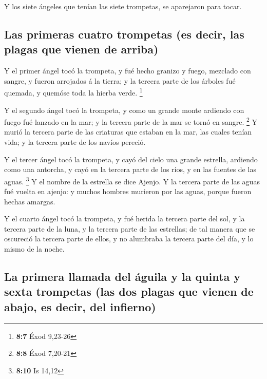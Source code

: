  Y los siete ángeles que tenían las siete trompetas, se
aparejaron para tocar.

\hypertarget{las-primeras-cuatro-trompetas-es-decir-las-plagas-que-vienen-de-arriba}{%
\subsection{Las primeras cuatro trompetas (es decir, las plagas que
vienen de
arriba)}\label{las-primeras-cuatro-trompetas-es-decir-las-plagas-que-vienen-de-arriba}}

 Y el primer ángel tocó la trompeta, y fué hecho granizo y
fuego, mezclado con sangre, y fueron arrojados á la tierra; y la tercera
parte de los árboles fué quemada, y quemóse toda la hierba verde.
\footnote{\textbf{8:7} Éxod 9,23-26}

 Y el segundo ángel tocó la trompeta, y como un grande monte
ardiendo con fuego fué lanzado en la mar; y la tercera parte de la mar
se tornó en sangre. \footnote{\textbf{8:8} Éxod 7,20-21}  Y
murió la tercera parte de las criaturas que estaban en la mar, las
cuales tenían vida; y la tercera parte de los navíos pereció.

 Y el tercer ángel tocó la trompeta, y cayó del cielo una
grande estrella, ardiendo como una antorcha, y cayó en la tercera parte
de los ríos, y en las fuentes de las aguas. \footnote{\textbf{8:10} Is
  14,12}  Y el nombre de la estrella se dice Ajenjo. Y la
tercera parte de las aguas fué vuelta en ajenjo: y muchos hombres
murieron por las aguas, porque fueron hechas amargas.

 Y el cuarto ángel tocó la trompeta, y fué herida la
tercera parte del sol, y la tercera parte de la luna, y la tercera parte
de las estrellas; de tal manera que se oscureció la tercera parte de
ellos, y no alumbraba la tercera parte del día, y lo mismo de la noche.

\hypertarget{la-primera-llamada-del-uxe1guila-y-la-quinta-y-sexta-trompetas-las-dos-plagas-que-vienen-de-abajo-es-decir-del-infierno}{%
\subsection{La primera llamada del águila y la quinta y sexta trompetas
(las dos plagas que vienen de abajo, es decir, del
infierno)}\label{la-primera-llamada-del-uxe1guila-y-la-quinta-y-sexta-trompetas-las-dos-plagas-que-vienen-de-abajo-es-decir-del-infierno}}

